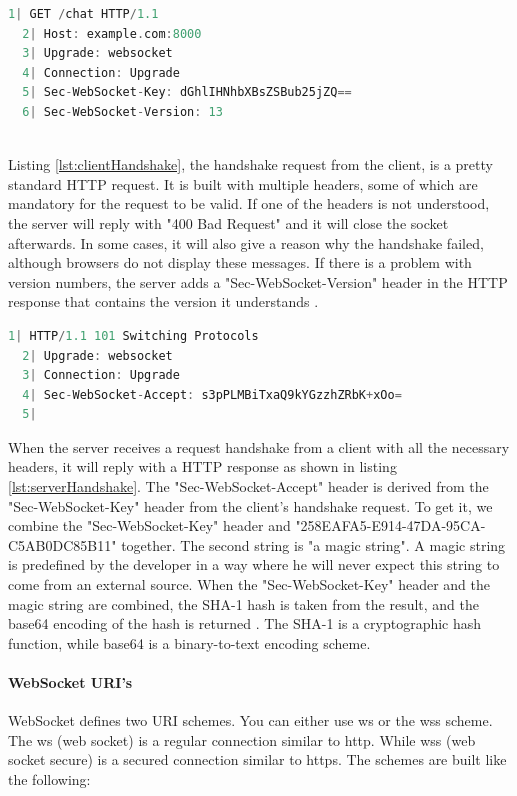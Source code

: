 \documentclass[a4paper, 11pt]{report}
\begin{document}
	\begin{lstlisting}[caption={Client's request for WebSocket handshake},captionpos=b, label={lst:clientHandshake}, language=c, float=h]
  1| GET /chat HTTP/1.1
  2| Host: example.com:8000
  3| Upgrade: websocket
  4| Connection: Upgrade
  5| Sec-WebSocket-Key: dGhlIHNhbXBsZSBub25jZQ==
  6| Sec-WebSocket-Version: 13
	\end{lstlisting}\\
Listing \ref{lst:clientHandshake}, the handshake request from the client, is a pretty standard HTTP request. It is built with multiple headers, some of which are mandatory for the request to be valid. If one of the headers is not understood, the server will reply with "400 Bad Request" and it will close the socket afterwards. In some cases, it will also give a reason why the handshake failed, although browsers do not display these messages. If there is a problem with version numbers, the server adds a "Sec-WebSocket-Version" header in the HTTP response that contains the version it understands \cite{BadRequest}.
	\begin{lstlisting}[caption={Server's response for WebSocket handshake},captionpos=b, label={lst:serverHandshake}, language=c, float=h]
  1| HTTP/1.1 101 Switching Protocols
  2| Upgrade: websocket
  3| Connection: Upgrade
  4| Sec-WebSocket-Accept: s3pPLMBiTxaQ9kYGzzhZRbK+xOo=
  5|
	\end{lstlisting}
When the server receives a request handshake from a client with all the necessary headers, it will reply with a HTTP response as shown in listing \ref{lst:serverHandshake}. The "Sec-WebSocket-Accept" header is derived from the "Sec-WebSocket-Key" header from the client's handshake request. To get it, we combine the "Sec-WebSocket-Key" header and "258EAFA5-E914-47DA-95CA-C5AB0DC85B11" together. The second string is "a magic string". A magic string is predefined by the developer in a way where he will never expect this string to come from an external source. When the "Sec-WebSocket-Key" header and the magic string are combined, the SHA-1 hash is taken from the result, and the base64 encoding of the hash is returned \cite{BadRequest}. The SHA-1 is a cryptographic hash function, while base64 is a binary-to-text encoding scheme.

		\paragraph{WebSocket URI's}
WebSocket defines two URI schemes. You can either use ws or the wss scheme. The ws (web socket) is a regular connection similar to http. While wss (web socket secure) is a secured connection similar to https. The schemes are built like the following:\\
\end{document}
